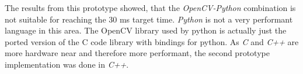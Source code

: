 The results from this prototype showed, that the \textit{OpenCV-Python} combination is not suitable for reaching the 30 ms target time. \textit{Python} is not a very performant language in this area. The OpenCV library used by python is actually just the ported version of the C code library with bindings for python. As \textit{C} and \textit{C++} are more hardware near and therefore more performant, the second prototype implementation was done in \textit{C++}.
